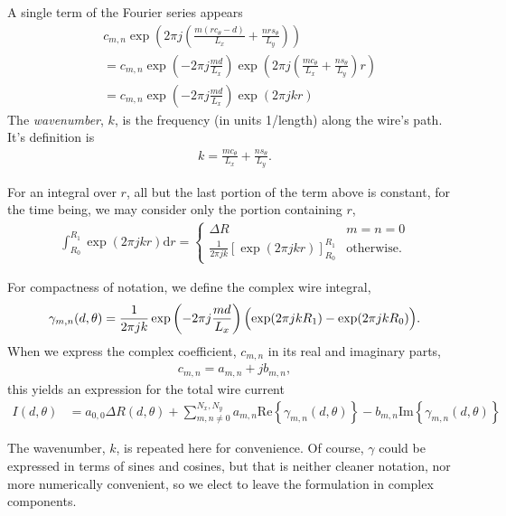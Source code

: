 \documentclass{article}
\def\d{\mathrm{d}}
\def\real{\mathrm{Re}}
\def\imag{\mathrm{Im}}
\begin{document}
A single term of the Fourier series appears
\begin{align*}
&c_{m,n} \exp\left(2\pi j \left( \frac{m(r c_\theta - d)}{L_x} + \frac{n r s_\theta}{L_y} \right)\right)\\
&= c_{m,n} \exp\left(-2\pi j \frac{md}{L_x} \right) \exp\left(2\pi j \left( \frac{m c_\theta}{L_x} + \frac{n s_\theta}{L_y} \right) r\right)\\
&= c_{m,n} \exp\left(-2\pi j \frac{md}{L_x} \right) \exp\left(2\pi j k r \right)
\end{align*}
The \emph{wavenumber}, $k$, is the frequency (in units 1/length) along the wire's path.  It's definition is
\begin{align}
k = \frac{m c_\theta}{L_x} + \frac{n s_\theta}{L_y}.
\end{align}

For an integral over $r$, all but the last portion of the term above is constant, for the time being, we may consider only the portion containing $r$,
\begin{align}
\int_{R_0}^{R_1} \exp\left(2\pi j k r \right) \d r = \left\{\begin{array}{c|l}
 \Delta R & m = n = 0\\
 \frac{1}{2\pi j k}\left[\exp\left(2\pi j k r \right)\right]^{R_1}_{R_0} & \mathrm{otherwise}.
\end{array}
\right.
\end{align}

For compactness of notation, we define the complex wire integral,
\begin{align}
\gamma_{m,n}(d,\theta) = \frac{1}{2\pi j k}\exp\left(-2\pi j \frac{md}{L_x}\right) \Bigl( \exp(2\pi j k R_1) - \exp(2\pi j k R_0) \Bigr).
\end{align}
When we express the complex coefficient, $c_{m,n}$ in its real and imaginary parts,
\begin{align}
c_{m,n} = a_{m,n} + j b_{m,n},
\end{align}
this yields an expression for the total wire current
\begin{align}
I(d,\theta) &= a_{0,0} \Delta R(d,\theta) + \sum_{m,n\ne 0}^{N_x,N_y} a_{m,n} \real \left\{ \gamma_{m,n}(d,\theta) \right\} - b_{m,n} \imag \left\{ \gamma_{m,n}(d,\theta) \right\}
\end{align}

The wavenumber, $k$, is repeated here for convenience.  Of course, $\gamma$ could be expressed in terms of sines and cosines, but that is neither cleaner notation, nor more numerically convenient, so we elect to leave the formulation in complex components.
\end{document}
